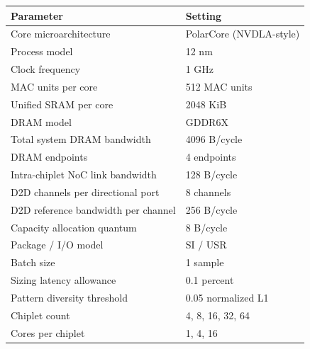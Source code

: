 \begin{tabular}{ll}
\hline
Parameter & Setting \\
\hline
Core microarchitecture & PolarCore (NVDLA-style)  \\
Process model & 12 nm \\
Clock frequency & 1 GHz \\
MAC units per core & 512 MAC units \\
Unified SRAM per core & 2048 KiB \\
DRAM model & GDDR6X  \\
Total system DRAM bandwidth & 4096 B/cycle \\
DRAM endpoints & 4 endpoints \\
Intra-chiplet NoC link bandwidth & 128 B/cycle \\
D2D channels per directional port & 8 channels \\
D2D reference bandwidth per channel & 256 B/cycle \\
Capacity allocation quantum & 8 B/cycle \\
Package / I/O model & SI / USR  \\
Batch size & 1 sample \\
Sizing latency allowance & 0.1 percent \\
Pattern diversity threshold & 0.05 normalized L1 \\
Chiplet count & 4, 8, 16, 32, 64 \\
Cores per chiplet & 1, 4, 16 \\
\hline
\end{tabular}
